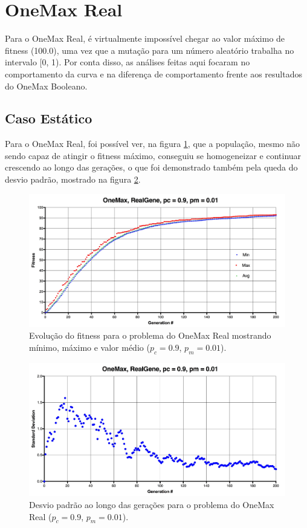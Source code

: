 \section{OneMax Real}

Para o OneMax Real, é virtualmente impossível chegar ao valor máximo de fitness (100.0), uma vez que a mutação para um número aleatório trabalha no intervalo [0, 1). Por conta disso, as análises feitas aqui focaram no comportamento da curva e na diferença de comportamento frente aos resultados do OneMax Booleano.

\subsection{Caso Estático}

Para o OneMax Real, foi possível ver, na figura \ref{fig:onemax_real}, que a população, mesmo não sendo capaz de atingir o fitness máximo, conseguiu se homogeneizar e continuar crescendo ao longo das gerações, o que foi demonstrado também pela queda do desvio padrão, mostrado na figura \ref{fig:onemax_real_std}.

\begin{figure}[ht!]
    \centering \includegraphics[width=1.0\textwidth]{onemax_real.jpg}
    \caption{Evolução do fitness para o problema do OneMax Real mostrando mínimo, máximo e valor médio ($p_c=0.9$, $p_m=0.01$).}
    \label{fig:onemax_real}
\end{figure}

\begin{figure}[ht!]
    \centering \includegraphics[width=1.0\textwidth]{onemax_real_std.jpg}
    \caption{Desvio padrão ao longo das gerações para o problema do OneMax Real ($p_c=0.9$, $p_m=0.01$).}
    \label{fig:onemax_real_std}
\end{figure}

